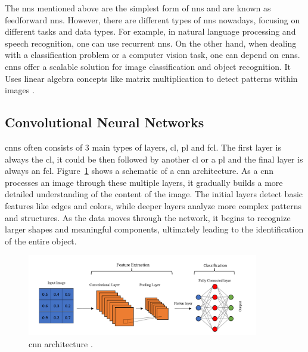 The \gls{nn}s mentioned above are the simplest form of \gls{nn}s and are known as feedforward \gls{nn}s. However, there are different types of \gls{nn}s nowadays, focusing on different tasks and data types. For example,  in natural language processing and speech recognition, one can use recurrent \gls{nn}s. On the other hand, when dealing with a classification problem or a computer vision task, one can depend on \gls{cnn}s. \gls{cnn}s offer a scalable solution for image classification and object recognition. It Uses linear algebra concepts like matrix multiplication to detect patterns within images \cite{ibm_cnn}.

\subsection{Convolutional Neural Networks}
\gls{cnn}s often consists of 3 main types of layers, \gls{cl}, \gls{pl} and \gls{fcl}. The first layer is always the \gls{cl}, it could be then followed by another \gls{cl} or a \gls{pl} and the final layer is always an \gls{fcl}. Figure~\ref{full_cnn} shows a schematic of a \gls{cnn} architecture. As a \gls{cnn} processes an image through these multiple layers, it gradually builds a more detailed understanding of the content of the image. The initial layers detect basic features like edges and colors, while deeper layers analyze more complex patterns and structures. As the data moves through the network, it begins to recognize larger shapes and meaningful components, ultimately leading to the identification of the entire object.

\begin{figure}[ht]
    \centering
    \includegraphics[width=0.9\textwidth]{Figures/Full_cnn.PNG} 
    \caption{\gls{cnn} architecture \cite{Full_CNN}.}
    \label{full_cnn}
\end{figure}

